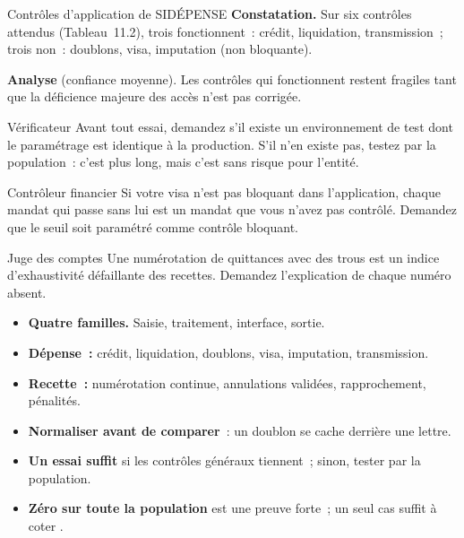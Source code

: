 \begin{boxlecture}{Contrôles d'application de SIDÉPENSE}
\textbf{Constatation.} Sur six contrôles attendus (Tableau~11.2), trois
fonctionnent~: crédit, liquidation, transmission~; trois non~: doublons,
visa, imputation (non bloquante).

\textbf{Analyse} (confiance moyenne). Les contrôles qui fonctionnent
restent fragiles tant que la déficience majeure des accès n'est pas
corrigée.

\medskip
\hfill{}
\end{boxlecture}

\begin{boxmetier}{Vérificateur}
Avant tout essai, demandez s'il existe un environnement de test dont le
paramétrage est identique à la production. S'il n'en existe pas, testez
par la population~: c'est plus long, mais c'est sans risque pour
l'entité.
\end{boxmetier}

\begin{boxmetier}{Contrôleur financier}
Si votre visa n'est pas bloquant dans l'application, chaque mandat qui
passe sans lui est un mandat que vous n'avez pas contrôlé. Demandez que le
seuil soit paramétré comme contrôle bloquant.
\end{boxmetier}

\begin{boxmetier}{Juge des comptes}
Une numérotation de quittances avec des trous est un indice
d'exhaustivité défaillante des recettes. Demandez l'explication de chaque
numéro absent.
\end{boxmetier}

\separateur

\begin{boxresume}
\begin{itemize}
    \item \textbf{Quatre familles.} Saisie, traitement, interface, sortie.
    \item \textbf{Dépense~:} crédit, liquidation, doublons, visa,
          imputation, transmission.
    \item \textbf{Recette~:} numérotation continue, annulations validées,
          rapprochement, pénalités.
    \item \textbf{Normaliser avant de comparer}~: un doublon se cache
          derrière une lettre.
    \item \textbf{Un essai suffit} si les contrôles généraux tiennent~;
          sinon, tester par la population.
    \item \textbf{Zéro sur toute la population} est une preuve forte~; un
          seul cas suffit à coter \NON{}.
\end{itemize}
\end{boxresume}

